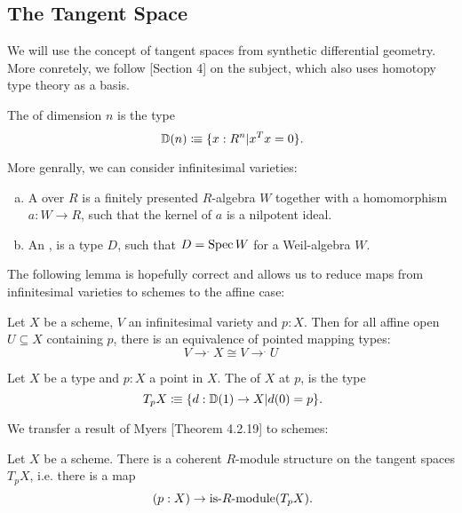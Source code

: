 \subsection{The Tangent Space}

We will use the concept of tangent spaces from synthetic differential geometry.
More conretely, we follow \cite{david-orbifolds}[Section 4]
on the subject, which also uses homotopy type theory as a basis.

\begin{definition}
  The  of dimension $n$ is the type
  \[ \D(n)\colonequiv \{x:R^n\vert x^Tx=0\}\rlap{.}\]
\end{definition}

More genrally, we can consider infinitesimal varieties:

\begin{definition}
  \begin{enumerate}[(a)]
  \item A  over $R$ is a finitely presented $R$-algebra
    $W$ together with a homomorphism $a:W\to R$, such that the kernel of $a$ is a nilpotent ideal.
  \item An , is a type $D$, such that $D=\operatorname{Spec} W$ for a Weil-algebra $W$.
  \end{enumerate}
\end{definition}

The following lemma is hopefully correct and allows us to reduce
maps from infinitesimal varieties to schemes
to the affine case:

\begin{lemma}
  \label{affine-opens-infinitesimal-closed}
  Let $X$ be a scheme, $V$ an infinitesimal variety and $p:X$.
  Then for all affine open $U\subseteq X$
  containing $p$, there is an equivalence
  of pointed mapping types:
  \[ V\to^. X \cong V\to^. U\]
\end{lemma}

\begin{definition}
  Let $X$ be a type and $p:X$ a point in $X$.
  The  of $X$ at $p$, is the type
  \[ T_pX\colonequiv \{d:\D(1)\to X\vert d(0)=p \}\rlap{.}\]
\end{definition}

We transfer a result of Myers \cite{david-orbifolds}[Theorem 4.2.19] to schemes:

\begin{theorem}%
  Let $X$ be a scheme.
  There is a coherent $R$-module structure on the tangent spaces $T_pX$,
  i.e. there is a map
  \[ (p:X)\to \text{is-$R$-module}(T_pX)\rlap{.}\]
\end{theorem}

